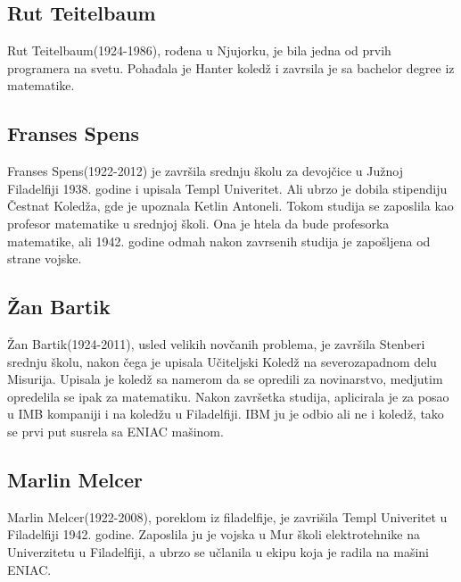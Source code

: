 \documentclass[a4paper,12pt]{article}
\begin{document}
\subsection{Rut Teitelbaum}
\begin{flushleft}

Rut Teitelbaum(1924-1986), rođena u Njujorku, je bila jedna od prvih programera na svetu. Pohađala je Hanter koledž i zavrsila je sa bachelor degree iz matematike.

\end{flushleft}

\subsection{Franses Spens}
\begin{flushleft}

Franses Spens(1922-2012) je završila srednju školu za devojčice u Južnoj Filadelfiji 1938. godine i upisala Templ Univeritet. Ali ubrzo je dobila stipendiju Čestnat Koledža, gde je upoznala Ketlin Antoneli. Tokom studija se zaposlila kao profesor matematike u srednjoj školi. Ona je htela da bude profesorka matematike, ali 1942. godine odmah nakon zavrsenih studija je zapošljena od strane vojske.

\end{flushleft}

\subsection{Žan Bartik}
\begin{flushleft}

Žan Bartik(1924-2011), usled velikih novčanih problema, je završila Stenberi srednju školu, nakon čega je upisala Učiteljski Koledž na severozapadnom delu Misurija. Upisala je koledž sa namerom da se opredili za novinarstvo, medjutim opredelila se ipak za matematiku. Nakon završetka studija, aplicirala je za posao u IMB kompaniji i na koledžu u Filadelfiji. IBM ju je odbio ali ne i koledž, tako se prvi put susrela sa ENIAC mašinom. 

\end{flushleft}

\subsection{Marlin Melcer}
\begin{flushleft}

Marlin Melcer(1922-2008), poreklom iz filadelfije, je zavrišila Templ Univeritet u Filadelfiji 1942. godine. Zaposlila ju je vojska u Mur školi elektrotehnike na Univerzitetu u Filadelfiji, a ubrzo se učlanila u ekipu koja je radila na mašini ENIAC. 

\end{flushleft}
\end{document}
